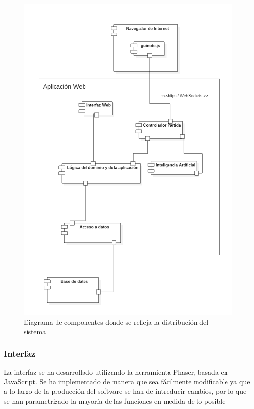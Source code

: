 \begin{figure}[H]
\centering
\includegraphics[scale = 0.5]{figuras/diagramaComponentes.png}
\caption{Diagrama de componentes donde se refleja la distribución del sistema}
\label{fig:diagramaComponentes}
\end{figure}

\subsubsection{Interfaz}
La interfaz se ha desarrollado utilizando la herramienta Phaser, basada en JavaScript. Se ha implementado de manera que sea fácilmente modificable ya que a lo largo de la producción del software se han de introducir cambios, por lo que se han parametrizado la mayoría de las funciones en medida de lo posible.

